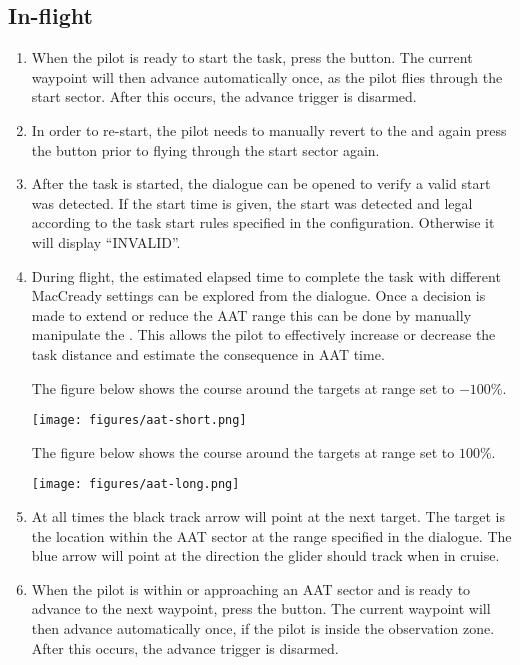 \subsection*{In-flight}
\begin{enumerate}
\item  When the pilot is ready to start the task, press the  button.  The current waypoint will then advance automatically
  once, as the pilot flies through the start sector.  After this occurs,
  the advance trigger is disarmed.
\item  In order to re-start, the pilot needs to manually revert to the
 and again press the  button prior to
  flying through the start sector again.
\item  After the task is started, the  dialogue can be opened to
  verify a valid start was detected. If the start time is given, the start was
  detected and legal according to the task start rules specified in the
  configuration.  Otherwise it will display ``INVALID''.
\item  During flight, the estimated elapsed time to complete the task with
  different MacCready settings can be explored from the  dialogue.
  Once a decision is made to extend or reduce the AAT range this can be done by
  manually manipulate the . This allows the pilot to effectively
  increase or decrease the task distance and estimate the consequence in AAT time.

The figure below shows the course around the targets at range set to $-100$\%.
\begin{center}
\texttt{[image: figures/aat-short.png]}
\end{center}

The figure below shows the course around the targets at range set to $100$\%.
\begin{center}
\texttt{[image: figures/aat-long.png]}
\end{center}

\item  At all times the black track arrow will point at the next target.  The
  target is the location within the AAT sector at the range specified in
  the  dialogue.  The blue arrow will point at the direction
  the glider should track when in cruise.

\item  When the pilot is within or approaching an AAT sector and is ready to
  advance to the next waypoint, press the  button.  The
  current waypoint will then advance automatically once, if the pilot is
  inside the observation zone.  After this occurs, the advance trigger
  is disarmed.


\end{enumerate}
